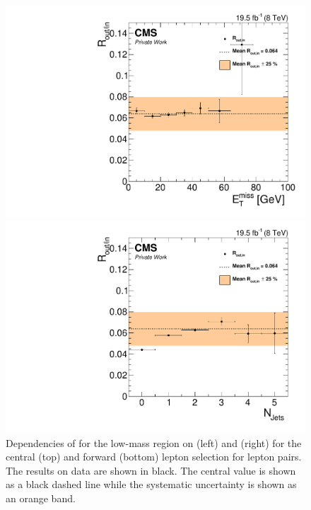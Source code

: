 \begin{figure}[htbp]
\begin{minipage}[t]{0.49\textwidth}
  \includegraphics[width=\textwidth]{plots/BG/rOutIn/rOutInSyst_DrellYanControlForward_Full2012_MET_LowMass_MM_None.pdf}
\end{minipage}
\begin{minipage}[t]{0.49\textwidth}
\includegraphics[width=\textwidth]{plots/BG/rOutIn/rOutInSyst_DrellYanControlForward_Full2012_NJets_LowMass_MM_None.pdf}
\end{minipage}
\caption{Dependencies of \Routin for the low-mass region on \MET (left) and \njets (right) for the central (top) and forward (bottom) lepton selection for \MM lepton pairs. The results on data are shown in black. The central value is shown as a black dashed line while the systematic uncertainty is shown as an orange band.}
\label{fig:ROutInDependencies5}
\end{figure} 


